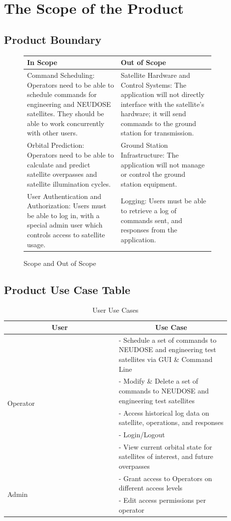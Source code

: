 \documentclass[12pt]{article}
\begin{document}
\section{The Scope of the Product}
\subsection{Product Boundary}
\begin{figure}[H]
\centering
\caption{Scope and Out of Scope}
\begin{tabular}{|p{0.45\linewidth}|p{0.45\linewidth}|}
\hline
\textbf{In Scope} & \textbf{Out of Scope} \\
\hline
Command Scheduling: Operators need to be able to schedule commands for engineering and NEUDOSE satellites. They should be able to work concurrently with other users. & Satellite Hardware and Control Systems: The application will not directly interface with the satellite’s hardware; it will send commands to the ground station for transmission. \\
\hline
Orbital Prediction: Operators need to be able to calculate and predict satellite overpasses and satellite illumination cycles. & Ground Station Infrastructure: The application will not manage or control the ground station equipment. \\
\hline
User Authentication and Authorization: Users must be able to log in, with a special admin user which controls access to satellite usage. & Logging: Users must be able to retrieve a log of commands sent, and responses from the application. \\
\hline
\end{tabular}
\end{figure}
\subsection{Product Use Case Table}

\begin{table}[H]
\centering
\caption{User Use Cases}
\begin{tabular}{|p{0.45\linewidth}|p{0.45\linewidth}|}
\hline
\multicolumn{1}{|c|}{User} & \multicolumn{1}{c|}{Use Case} \\
\hline
\multirow{5}{*}{Operator} & - Schedule a set of commands to NEUDOSE and engineering test satellites via GUI \& Command Line \\
& - Modify \& Delete a set of commands to NEUDOSE and engineering test satellites \\
& - Access historical log data on satellite, operations, and responses \\
& - Login/Logout \\
& - View current orbital state for satellites of interest, and future overpasses \\
\hline
\multirow{2}{*}{Admin} & - Grant access to Operators on different access levels \\
& - Edit access permissions per operator \\
\hline
\end{tabular}
\end{table}
\end{document}
